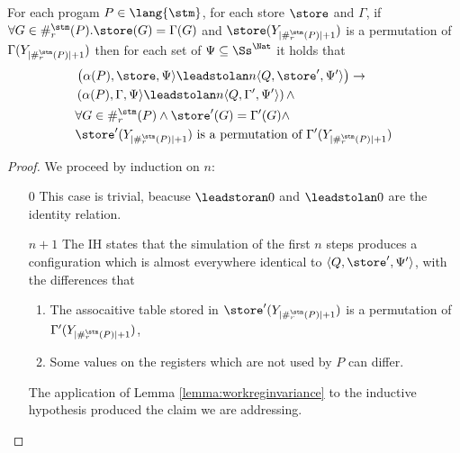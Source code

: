 \begin{lemma}
  \label{lemma:workreginvariance2}
  For each progam $P \in \lang{\stm}$, for each store $\store$ and $\Gamma$,
  if $\forall G \in \#_r^\stm(P).\store(G)=\Gamma(G)$ and
  $\store(Y_{{|\#_r^\stm(P)|+1}})$ is a permutation of
  $\Gamma(Y_{{|\#_r^\stm(P)|+1}})$ then for each set of
  $\Psi \subseteq \Ss^\Nat$ it holds that
  \begin{align*}
    &\left(\alpha(P), \store, \Psi\rangle \leadstolan n \langle Q, \store', \Psi'\rangle\right)\to\\
    &\left(\alpha(P), \Gamma, \Psi\rangle \leadstolan n \langle Q, \Gamma', \Psi'\rangle\right)\land\\
    &\forall G \in \#_r^\stm(P)\land \store'(G)=\Gamma'(G) \land\\
    &\store'(Y_{{|\#_r^\stm(P)|+1}}) \text{ is a permutation of }\Gamma'(Y_{{|\#_r^\stm(P)|+1}})
  \end{align*}
\end{lemma}
\begin{proof}
  We proceed by induction on $n$:
  \begin{itemize}
    \item [$0$] This case is trivial, beacuse $\leadstoran 0$ and $\leadstolan 0$
    are the identity relation.
    \item [$n+1$] The IH states that the simulation of the first
    $n$ steps produces a configuration which is almost everywhere identical to
    $\langle Q, \store', \Psi'\rangle$, with the differences that
    \begin{enumerate}
      \item The assocaitive table stored in $\store'(Y_{{|\#_r^\stm(P)|+1}})$
      is a permutation of $\Gamma'(Y_{{|\#_r^\stm(P)|+1}})$,
      \item Some values on the registers which are not used by $P$ can differ.
    \end{enumerate}
    The application of Lemma \ref{lemma:workreginvariance} to the inductive
    hypothesis produced the claim we are addressing.
  \end{itemize}
\end{proof}

